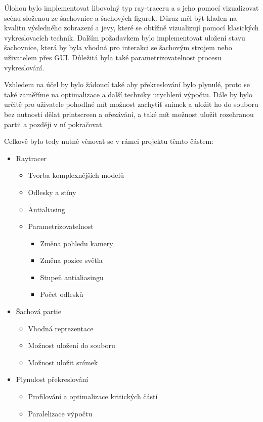 \documentclass[12pt,a4paper,titlepage,final]{report}
\begin{document}
Úlohou bylo implementovat libovolný typ ray-traceru a s jeho pomocí vizualizovat scénu složenou ze šachovnice a šachových figurek. Důraz měl být kladen na kvalitu výsledného zobrazení a jevy, které se obtížně vizualizují pomocí klasických vykreslovacích technik. Dalším požadavkem bylo implementovat uložení stavu šachovnice, která by byla vhodná pro interakci se šachovým strojem nebo uživatelem přes GUI. Důležitá byla také parametrizovatelnost procesu vykreslování.

Vzhledem na účel by bylo žádoucí také aby překreslování bylo plynulé, proto se také zaměříme na optimalizace a další techniky urychlení výpočtu. Dále by bylo určitě pro uživatele pohodlné mít možnost zachytiť snímek a uložit ho do souboru bez nutnosti dělat printscreen a ořezávání, a také mít možnost uložit rozehranou partii a později v ní pokračovat.   

Celkově bylo tedy nutné věnovat se v rámci projektu těmto částem:
\begin{itemize}
	\item Raytracer
	\begin{itemize}
	    \item Tvorba komplexnějších modelů
		\item Odlesky a stíny
		\item Antialiasing
		\item Parametrizovatelnost
		\begin{itemize}
			\item Změna pohledu kamery
			\item Změna pozice světla
			\item Stupeň antialiasingu
			\item Počet odlesků
		\end{itemize}
	\end{itemize}
	\item Šachová partie
	\begin{itemize}
		\item Vhodná reprezentace
		\item Možnost uložení do souboru
		\item Možnost uložit snímek 
	\end{itemize}
	\item Plynulost překreslování
	\begin{itemize}
		\item Profilování a optimalizace kritických částí
		\item Paralelizace výpočtu
	\end{itemize}
\end{itemize}
\end{document}
